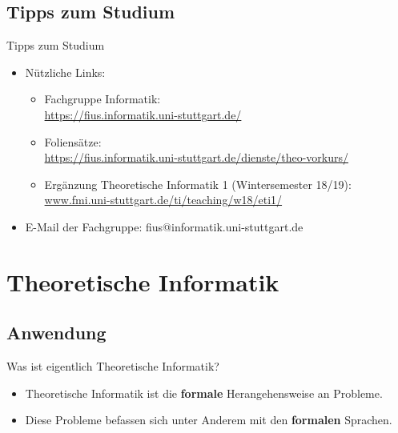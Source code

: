 \documentclass[10pt]{beamer}
\begin{document}
\subsection{Tipps zum Studium}
\begin{frame}[fragile]{Tipps zum Studium}
    \begin{itemize}
        \item Nützliche Links:\\
            \begin{itemize}
                \item Fachgruppe Informatik:\\
                \url{https://fius.informatik.uni-stuttgart.de/}
                \item Foliensätze:\\ \url{https://fius.informatik.uni-stuttgart.de/dienste/theo-vorkurs/}
                 \item Ergänzung Theoretische Informatik 1 (Wintersemester 18/19): \\
                 \url{www.fmi.uni-stuttgart.de/ti/teaching/w18/eti1/}
            \end{itemize}
        \item E-Mail der Fachgruppe: fius@informatik.uni-stuttgart.de
            
    \end{itemize}
\end{frame}


\section{Theoretische Informatik}

\subsection{Anwendung}
\begin{frame}[fragile]{Was ist eigentlich Theoretische Informatik?}
    \begin{itemize} 
    \item Theoretische Informatik ist die \textbf{formale} Herangehensweise an Probleme.\\
    \item Diese Probleme befassen sich unter Anderem mit den \textbf{formalen} Sprachen.
    \end{itemize}
\end{frame}
\end{document}
